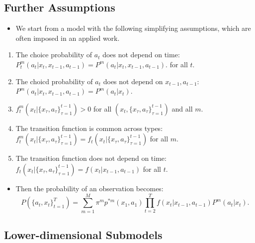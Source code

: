 \documentclass[
]{book}
\providecommand{\tightlist}{%
  \setlength{\itemsep}{0pt}\setlength{\parskip}{0pt}}
\begin{document}
\hypertarget{assumptions-finite-mixture}{%
\subsection{Further Assumptions}\label{assumptions-finite-mixture}}

\begin{itemize}
\tightlist
\item
  We start from a model with the following simplifying assumptions, which are often imposed in an applied work.
\end{itemize}

\begin{enumerate}
\def\labelenumi{\arabic{enumi}.}
\tightlist
\item
  The choice probability of \(a_t\) does not depend on time: \(P_t^m(a_t|x_t, x_{t - 1}, a_{t - 1}) = P^m(a_t|x_t, x_{t - 1}, a_{t - 1})\). for all \(t\).
\item
  The choicd probability of \(a_t\) does not depend on \(x_{t - 1}, a_{t - 1}\): \(P^m(a_t|x_t, x_{t - 1}, a_{t - 1}) = P^m(a_t|x_t)\).
\item
  \(f_t^{m}(x_t|\{x_\tau, a_\tau\}_{\tau = 1}^{t - 1}) > 0\) for all \((x_t, \{x_\tau, a_\tau\}_{\tau = 1}^{t - 1})\) and all \(m\).
\item
  The transition function is common across types: \(f_t^m(x_t|\{x_\tau, a_\tau\}_{\tau = 1}^{t - 1}) = f_t(x_t|\{x_\tau, a_\tau\}_{\tau = 1}^{t - 1})\) for all \(m\).
\item
  The transition function does not depend on time: \(f_t(x_t|\{x_\tau, a_\tau\}_{\tau = 1}^{t - 1}) = f(x_t|x_{t - 1}, a_{t - 1})\) for all \(t\).
\end{enumerate}

\begin{itemize}
\tightlist
\item
  Then the probability of an observation becomes:
  \[
  P(\{a_t, x_t\}_{t = 1}^T) = \sum_{m = 1}^M \pi^m p^{*m}(x_1, a_1) \prod_{t = 2}^T f(x_t|x_{t - 1}, a_{t - 1}) P^m(a_t| x_t).
  \]
\end{itemize}

\hypertarget{lower-dimensional-submodels}{%
\subsection{Lower-dimensional Submodels}\label{lower-dimensional-submodels}}
\end{document}
